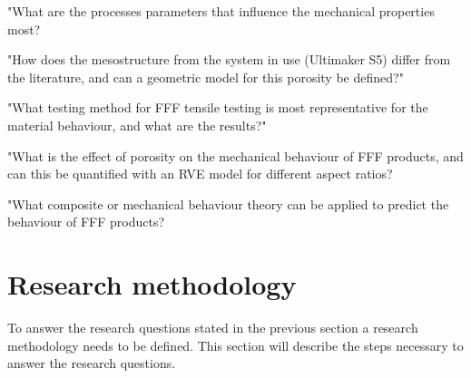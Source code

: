 "What are the processes parameters that influence the mechanical properties most?

"How does the mesostructure from the system in use (Ultimaker S5) differ from the literature, and can a geometric model for this porosity be defined?"

"What testing method for FFF tensile testing is most representative for the material behaviour, and what are the results?"

"What is the effect of porosity on the mechanical behaviour of FFF products, and can this be quantified with an RVE model for different aspect ratios?

"What composite or mechanical behaviour theory can be applied to predict the behaviour of FFF products?











\section{Research methodology}
To answer the research questions stated in the previous section a research methodology needs to be defined. This section will describe the steps necessary to answer the research questions. 

